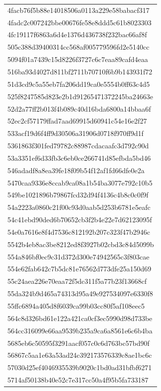 \begin{tabular}{l}
4facb76f5b88e14018506a0113a229e58babacf317 \\
4fadc2c007242bbe00676fe58e8ddd5c61b8023303 \\
4fc19117f6863a6d4e1376d436738f232bac66af8f \\
505c388d39400314cc568af005779596fd2e5140cc \\
5094f01a7439c15d8226f3727c6c7eaa89cafd4eaa \\
516ba93d4027d811bf2711b70710f6b9b143931f72 \\
51d3cd9c5a55eb7fa206dd19ca0e5554b0ff63c4d5 \\
525f8247585d823e2b1d91265471372245ba24663e \\
52d2a77ff2b013f4b089c40d16bda6800a14bbaa6f \\
52ec2cf57179ffad7aad69915d60941c54e16e2f27 \\
533acf19d6f4ff9d30506a31906d0718f970ff9d1f \\
5361863f301fed79782c88987cdacaafc3d792c90d \\
53a3351ef6d33fb3c6eb0ce266741d85efbda5bd46 \\
546adadf8a8ea39fe18f09b54f12af1fd66dfe0e2a \\
5470caa9336e8ccab9ca08a1b54ba3077e792c10b5 \\
549be1021896b79867fcd32d94f4136c4b8c0c0f9f \\
54a2223a0860c21f00c93d0aab5d253b6781e5eafc \\
54c41ebd90ded6b70652cb3f2b4e22e7d62123095f \\
54e0a7616e8f4d7536c812192b207c323f47b2946c \\
5542b4eb8ac3be8212ed8f3927b02cbd3c84d5099b \\
554a846bf0ec9c31d372d300e74942565c3f803cae \\
554e62fab642c7b5dc81e76562d773dfe25a150d69 \\
55c24aea226e70eaa72f5dc311f5a77b23f13668cf \\
55da324b9d465a74313d95a49e927534097e6330f8 \\
55ffc6894a405d8f6039ca99b03cc80f5af108eec5 \\
564c8d326bd61e122a421ca0cf3ec5990d98d733be \\
564cc316099e66aa9539b235a9ca6a8561e6c6b4ba \\
5685eb6c50595f3291aacf057c0c6d763bc57bd90f \\
56867c5aa1e63a53ad24c392173576339c8ae1bc6c \\
57030d25ef4046935539b9020c1bd0ad31bfbf6271 \\
5714af50138b40e52c7e317cc50a4f95b5fa733187 \\

\end{tabular}
